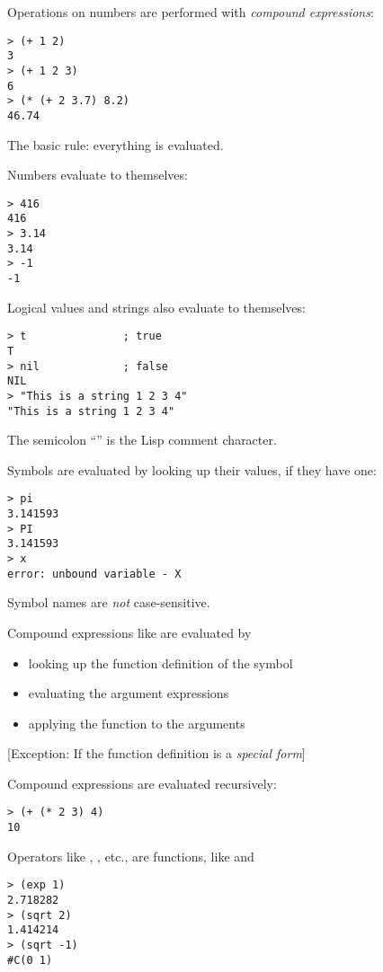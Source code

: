 \begin{slide}{}
Operations on numbers are performed with {\em compound expressions}:
\begin{verbatim}
> (+ 1 2)
3
> (+ 1 2 3)
6
> (* (+ 2 3.7) 8.2)
46.74
\end{verbatim}

The basic rule: everything is evaluated.

Numbers evaluate to themselves:
\begin{verbatim}
> 416
416
> 3.14
3.14
> -1
-1
\end{verbatim}
\end{slide}

\begin{slide}{}
Logical values and strings also evaluate to themselves:
\begin{verbatim}
> t               ; true
T
> nil             ; false
NIL
> "This is a string 1 2 3 4"
"This is a string 1 2 3 4"
\end{verbatim}
The semicolon ``\dcode{;}'' is the Lisp comment character.

Symbols are evaluated by looking up their values, if they have one:
\begin{verbatim}
> pi
3.141593
> PI
3.141593
> x
error: unbound variable - X
\end{verbatim}
Symbol names are {\em not} case-sensitive.
\end{slide}

\begin{slide}{}
Compound expressions like  are evaluated by
\begin{itemize}
\item looking up the function definition of the symbol \dcode{+}
\item evaluating the argument expressions
\item applying the function to the arguments
\end{itemize}
{[Exception: If the function definition is a {\em special form}]}

Compound expressions are evaluated recursively:
{\Large
\begin{verbatim}
> (+ (* 2 3) 4)
10
\end{verbatim}}
Operators like \dcode{+}, \dcode{*}, etc., are functions, like
 and 
{\Large
\begin{verbatim}
> (exp 1)
2.718282
> (sqrt 2)
1.414214
> (sqrt -1)
#C(0 1)
\end{verbatim}}
\end{slide}

